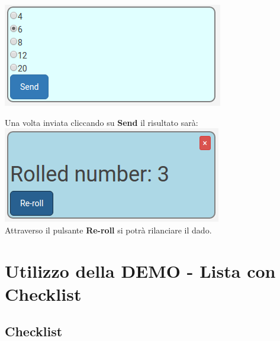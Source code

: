 \includegraphics[scale=0.75]{img/randConfig.png}

Una volta inviata cliccando su \textbf{Send} il risultato sarà:\\

\includegraphics[scale=0.75]{img/rand.png}
\\
Attraverso il pulsante \textbf{Re-roll} si potrà rilanciare il dado.

\newpage

\section{Utilizzo della DEMO - Lista con Checklist}

\subsection{Checklist}

